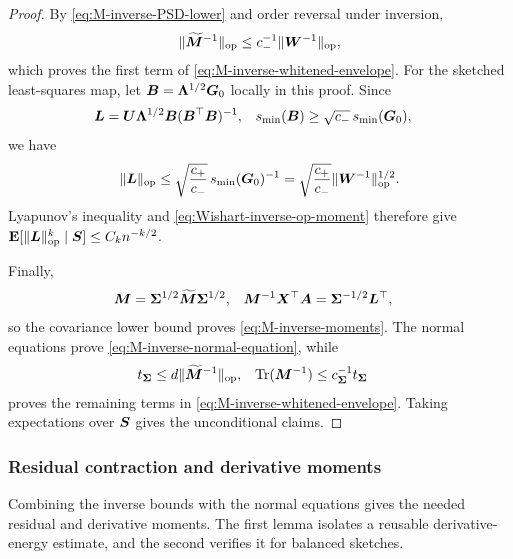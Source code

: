 \documentclass{article}
\theoremstyle{plain} %
\theoremstyle{definition} %
\theoremstyle{definition} %
\begin{document}
\begin{proof}
By \eqref{eq:M-inverse-PSD-lower} and order reversal under inversion,
\begin{align*}
    \lVert\widetilde{\boldsymbol{M}}^{-1}\rVert_{\rm op}
    \leq c_-^{-1}\lVert\boldsymbol{W}^{-1}\rVert_{\rm op},
\end{align*}
which proves the first term of
\eqref{eq:M-inverse-whitened-envelope}.  For the sketched least-squares map,
let $\boldsymbol{B}=\boldsymbol{\Lambda}^{1/2}\boldsymbol{G}_0$ locally in this proof. Since
\begin{align*}
    \boldsymbol{L}
    &=\boldsymbol{U}\boldsymbol{\Lambda}^{1/2}\boldsymbol{B}(\boldsymbol{B}^\top\boldsymbol{B})^{-1},
    &
    s_{\min}(\boldsymbol{B})&\geq\sqrt{c_-}\,s_{\min}(\boldsymbol{G}_0),
\end{align*}
we have
\begin{align*}
    \lVert\boldsymbol{L}\rVert_{\rm op}
    \leq\sqrt{\frac{c_+}{c_-}}\,
       s_{\min}(\boldsymbol{G}_0)^{-1}
    =\sqrt{\frac{c_+}{c_-}}
       \lVert\boldsymbol{W}^{-1}\rVert_{\rm op}^{1/2}.
\end{align*}
Lyapunov's inequality and \eqref{eq:Wishart-inverse-op-moment} therefore give
${\mathbf{E}}[\lVert\boldsymbol{L}\rVert_{\rm op}^k\mid\boldsymbol{S}]\leq C_kn^{-k/2}$.

Finally,
\begin{align*}
    \boldsymbol{M}
    &=\boldsymbol{\Sigma}^{1/2}\widetilde{\boldsymbol{M}}\boldsymbol{\Sigma}^{1/2},
    &
    \boldsymbol{M}^{-1}\boldsymbol{X}^\top\boldsymbol{A}
    &=\boldsymbol{\Sigma}^{-1/2}\boldsymbol{L}^\top,
\end{align*}
so the covariance lower bound proves \eqref{eq:M-inverse-moments}.
The normal equations prove \eqref{eq:M-inverse-normal-equation}, while
\begin{align*}
    t_{\boldsymbol{\Sigma}}
    &\leq d\lVert\widetilde{\boldsymbol{M}}^{-1}\rVert_{\rm op},
    &
    \operatorname{Tr}(\boldsymbol{M}^{-1})
    &\leq c_{\boldsymbol{\Sigma}}^{-1}
       t_{\boldsymbol{\Sigma}}
\end{align*}
proves the remaining terms in
\eqref{eq:M-inverse-whitened-envelope}.  Taking expectations over $\boldsymbol{S}$
gives the unconditional claims.
\end{proof}

\subsubsection{Residual contraction and derivative moments}

Combining the inverse bounds with the normal equations gives the needed
residual and derivative moments. The first lemma isolates a reusable
derivative-energy estimate, and the second verifies it for balanced sketches.
\end{document}
